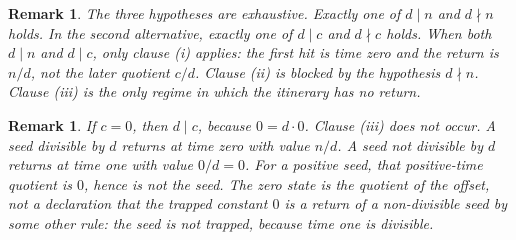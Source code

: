 \documentclass[11pt,letterpaper]{article}
\newtheorem{remark}[theorem]{Remark}
\begin{document}
\begin{remark}
\label{rem:exhaustive}
The three hypotheses are exhaustive. Exactly one of \(d\mid n\) and \(d\nmid n\) holds. In the second alternative, exactly one of \(d\mid c\) and \(d\nmid c\) holds. When both \(d\mid n\) and \(d\mid c\), only clause \textup{(i)} applies: the first hit is time zero and the return is \(n/d\), not the later quotient \(c/d\). Clause \textup{(ii)} is blocked by the hypothesis \(d\nmid n\). Clause \textup{(iii)} is the only regime in which the itinerary has no return.
\end{remark}

\begin{remark}
\label{rem:zero-offset}
If \(c=0\), then \(d\mid c\), because \(0=d\cdot 0\). Clause \textup{(iii)} does not occur. A seed divisible by \(d\) returns at time zero with value \(n/d\). A seed not divisible by \(d\) returns at time one with value \(0/d=0\). For a positive seed, that positive-time quotient is \(0\), hence is not the seed. The zero state is the quotient of the offset, not a declaration that the trapped constant \(0\) is a return of a non-divisible seed by some other rule: the seed is not trapped, because time one is divisible.
\end{remark}
\end{document}
